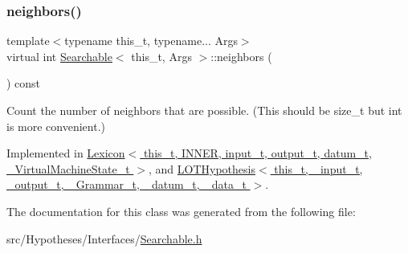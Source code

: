 \subsubsection{\texorpdfstring{neighbors()}{neighbors()}}
{\footnotesize\ttfamily template$<$typename this\+\_\+t, typename... Args$>$ \\
virtual int \hyperlink{class_searchable}{Searchable}$<$ this\+\_\+t, Args $>$\+::neighbors (\begin{DoxyParamCaption}{ }\end{DoxyParamCaption}) const\hspace{0.3cm}{\ttfamily [pure virtual]}}



Count the number of neighbors that are possible. (This should be size\+\_\+t but int is more convenient.) 



Implemented in \hyperlink{class_lexicon_ae6f2b66da71145d0e8983951513b994c}{Lexicon$<$ this\+\_\+t, I\+N\+N\+E\+R, input\+\_\+t, output\+\_\+t, datum\+\_\+t, \+\_\+\+Virtual\+Machine\+State\+\_\+t $>$}, and \hyperlink{class_l_o_t_hypothesis_ac1fcba4457efaf7566ee6454c0785e74}{L\+O\+T\+Hypothesis$<$ this\+\_\+t, \+\_\+input\+\_\+t, \+\_\+output\+\_\+t, \+\_\+\+Grammar\+\_\+t, \+\_\+datum\+\_\+t, \+\_\+data\+\_\+t $>$}.



The documentation for this class was generated from the following file\+:\begin{DoxyCompactItemize}
\item 
src/\+Hypotheses/\+Interfaces/\hyperlink{_searchable_8h}{Searchable.\+h}\end{DoxyCompactItemize}
